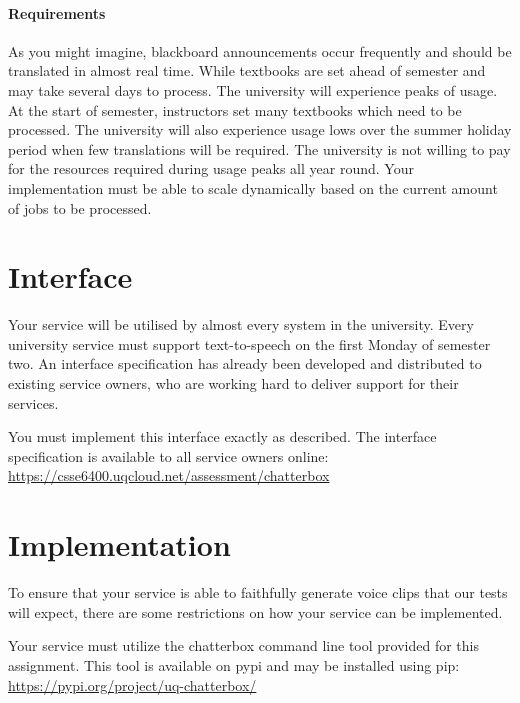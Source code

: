 \documentclass{csse4400}
\begin{document}
\paragraph{Requirements}
As you might imagine,
blackboard announcements occur frequently and should be translated in almost real time.
While textbooks are set ahead of semester and may take several days to process.
The university will experience peaks of usage.
At the start of semester,
instructors set many textbooks which need to be processed.
The university will also experience usage lows over the summer holiday period when few translations will be required.
The university is not willing to pay for the resources required during usage peaks all year round.
Your implementation must be able to scale dynamically based on the current amount of jobs to be processed.



\section{Interface}
Your service will be utilised by almost every system in the university.
Every university service must support text-to-speech on the first Monday of semester two.
An interface specification has already been developed and distributed to existing service owners,
who are working hard to deliver support for their services.

You must implement this interface exactly as described.
The interface specification is available to all service owners online:
\url{https://csse6400.uqcloud.net/assessment/chatterbox}

\section{Implementation}
To ensure that your service is able to faithfully generate voice clips that our tests will expect,
there are some restrictions on how your service can be implemented.

Your service must utilize the chatterbox command line tool provided for this assignment.
This tool is available on pypi and may be installed using pip: \url{https://pypi.org/project/uq-chatterbox/}
\end{document}
